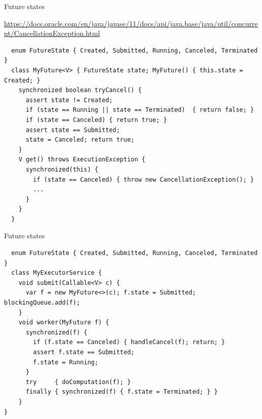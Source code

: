 \begin{frame}{Future states}

{\tiny\url{https://docs.oracle.com/en/java/javase/11/docs/api/java.base/java/util/concurrent/CancellationException.html}}
\begin{verbatim}
  enum FutureState { Created, Submitted, Running, Canceled, Terminated }
  class MyFuture<V> { FutureState state; MyFuture() { this.state = Created; }
    synchronized boolean tryCancel() {      
      assert state != Created;
      if (state == Running || state == Terminated)  { return false; }
      if (state == Canceled) { return true; }
      assert state == Submitted;
      state = Canceled; return true;
    }
    V get() throws ExecutionException {
      synchronized(this) {
        if (state == Canceled) { throw new CancellationException(); }
        ...
      }
    }
  }
\end{verbatim}
\end{frame}

\begin{frame}{Future states}
\begin{verbatim}
  enum FutureState { Created, Submitted, Running, Canceled, Terminated }
  class MyExecutorService {
    void submit(Callable<V> c) {
      var f = new MyFuture<>(c); f.state = Submitted; blockingQueue.add(f);
    }
    void worker(MyFuture f) {
      synchronized(f) {        
        if (f.state == Canceled) { handleCancel(f); return; }
        assert f.state == Submitted;
        f.state = Running;
      }
      try     { doComputation(f); }
      finally { synchronized(f) { f.state = Terminated; } }
    }
}
\end{verbatim}
\end{frame}

